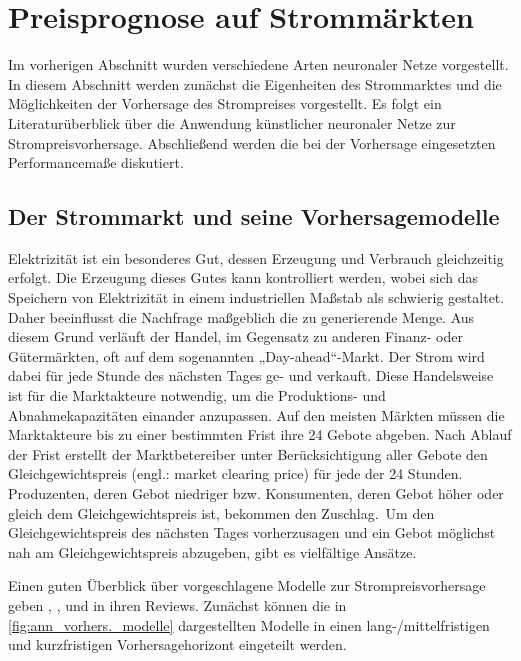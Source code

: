 

\section{Preisprognose auf Strommärkten}\label{sec:strompreis}

Im vorherigen Abschnitt wurden verschiedene Arten neuronaler Netze vorgestellt. In diesem Abschnitt werden zunächst die Eigenheiten des Strommarktes und die Möglichkeiten der Vorhersage des Strompreises vorgestellt. Es folgt ein Literaturüberblick über die Anwendung künstlicher neuronaler Netze zur Strompreisvorhersage. Abschließend werden die bei der Vorhersage eingesetzten Performancemaße diskutiert.


\subsection{Der Strommarkt und seine Vorhersagemodelle}\label{sec:vorhersagemodelle}

Elektrizität ist ein besonderes Gut, dessen Erzeugung und Verbrauch gleichzeitig erfolgt. Die Erzeugung dieses Gutes kann kontrolliert werden, wobei sich das Speichern von Elektrizität in einem industriellen Maßstab als schwierig gestaltet. Daher beeinflusst die Nachfrage maßgeblich die zu generierende Menge. Aus diesem Grund verläuft der Handel, im Gegensatz zu anderen Finanz- oder Gütermärkten, oft auf dem sogenannten „Day-ahead“-Markt. Der Strom wird dabei für jede Stunde des nächsten Tages ge- und verkauft. Diese Handelsweise ist für die Marktakteure notwendig, um die Produktions- und Abnahmekapazitäten einander anzupassen. Auf den meisten Märkten müssen die Marktakteure bis zu einer bestimmten Frist ihre 24 Gebote abgeben. Nach Ablauf der Frist erstellt der Marktbetereiber unter Berücksichtigung aller Gebote den Gleichgewichtspreis (engl.: market clearing price) für jede der 24 Stunden. Produzenten, deren Gebot niedriger bzw. Konsumenten, deren Gebot höher oder gleich dem Gleichgewichtspreis ist, bekommen den Zuschlag.\, Um den Gleichgewichtspreis des nächsten Tages vorherzusagen und ein Gebot möglichst nah am Gleichgewichtspreis abzugeben, gibt es vielfältige Ansätze.

Einen guten Überblick über vorgeschlagene Modelle zur Strompreisvorhersage geben \citet{Aggarwal2009}, \citet{Cerjan2013}, \citet{Weron2014} und \citet{Panapakidis2016} in ihren Reviews. Zunächst können die in \autoref{fig:ann_vorhers._modelle} dargestellten Modelle in einen lang-/mittelfristigen und kurzfristigen Vorhersagehorizont eingeteilt werden. 

